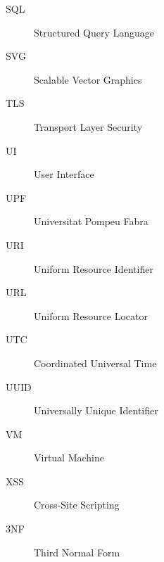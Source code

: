 \documentclass[a4paper,openany,twoside,11pt]{report}
\begin{document}
\begin{description}
   \item[SQL] Structured Query Language
   \item[SVG] Scalable Vector Graphics
   \item[TLS] Transport Layer Security
   \item[UI] User Interface
   \item[UPF] Universitat Pompeu Fabra
   \item[URI] Uniform Resource Identifier
   \item[URL] Uniform Resource Locator
   \item[UTC] Coordinated Universal Time
   \item[UUID] Universally Unique Identifier
   \item[VM] Virtual Machine
   \item[XSS] Cross-Site Scripting
   \item[3NF] Third Normal Form
\end{description}
\cleardoublepage

\setcounter{page}{1}

























\appendix






\end{document}
